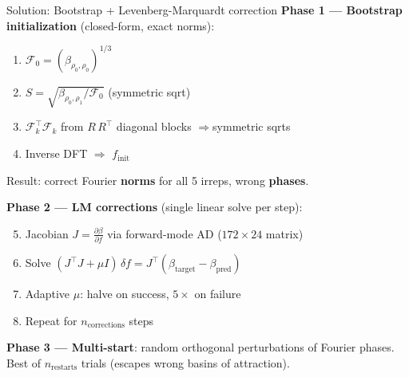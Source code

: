 \documentclass[aspectratio=169]{beamer}
\begin{document}
\begin{frame}{Solution: Bootstrap + Levenberg-Marquardt correction}
  \textbf{Phase 1 --- Bootstrap initialization} (closed-form, exact norms):
  \begin{enumerate}
    \item $\mathcal{F}_0 = (\beta_{\rho_0,\rho_0})^{1/3}$
    \item $S = \sqrt{\beta_{\rho_0,\rho_1}/\mathcal{F}_0}$ \quad (symmetric sqrt)
    \item $\mathcal{F}_k^\top\mathcal{F}_k$ from $R\,R^\top$ diagonal blocks \quad$\Rightarrow$\quad symmetric sqrts
    \item Inverse DFT $\Rightarrow$ $f_{\text{init}}$
  \end{enumerate}

  Result: correct Fourier \textbf{norms} for all 5 irreps, wrong \textbf{phases}.

  \bigskip

  \textbf{Phase 2 --- LM corrections} (single linear solve per step):
  \begin{enumerate}\setcounter{enumi}{4}
    \item Jacobian $J = \tfrac{\partial \beta}{\partial f}$ via forward-mode AD \quad ($172 \times 24$ matrix)
    \item Solve $(J^\top J + \mu I)\,\delta f = J^\top (\beta_{\text{target}} - \beta_{\text{pred}})$
    \item Adaptive $\mu$: halve on success, $5\times$ on failure
    \item Repeat for $n_{\text{corrections}}$ steps
  \end{enumerate}

  \bigskip

  \textbf{Phase 3 --- Multi-start}: random orthogonal perturbations of Fourier phases.
  Best of $n_{\text{restarts}}$ trials (escapes wrong basins of attraction).
\end{frame}
\end{document}
